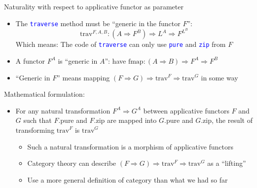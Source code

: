 \documentclass[english]{beamer}
\begin{document}
\begin{frame}{Naturality with respect to applicative functor as parameter}
\begin{itemize}
\item \vspace{-0.15cm}The{\footnotesize{} }\texttt{\textcolor{blue}{\footnotesize{}traverse}}
method must be ``generic in the functor $F$'':{\footnotesize{}
\[
\text{trav}^{F,A,B}:(A\Rightarrow F^{B})\Rightarrow L^{A}\Rightarrow F^{L^{B}}
\]
}Which means: The code of \texttt{\textcolor{blue}{\footnotesize{}traverse}}
can only use \texttt{\textcolor{blue}{\footnotesize{}pure}} and \texttt{\textcolor{blue}{\footnotesize{}zip}}
from $F$
\item A functor {\footnotesize{}$F^{A}$ }is ``generic in $A$'': have
{\footnotesize{}$\text{fmap}:\left(A\Rightarrow B\right)\Rightarrow F^{A}\Rightarrow F^{B}$}{\footnotesize\par}
\item ``Generic in $F$'' means mapping {\footnotesize{}$\left(F\Rightarrow G\right)\Rightarrow\text{trav}^{F}\Rightarrow\text{trav}^{G}$}
in some way
\end{itemize}
Mathematical formulation:
\begin{itemize}
\item For any natural transformation $F^{A}\Rightarrow G^{A}$ between applicative
functors $F$ and $G$ such that $F.\text{pure}$ and $F.\text{zip}$
are mapped into $G.\text{pure}$ and $G.\text{zip}$, the result of
transforming $\text{trav}^{F}$ is $\text{trav}^{G}$
\begin{itemize}
\item Such a natural transformation is a morphism of applicative functors
\item Category theory can describe {\footnotesize{}$\left(F\Rightarrow G\right)\Rightarrow\text{trav}^{F}\Rightarrow\text{trav}^{G}$}
as a ``lifting''
\item Use a more general definition of category than what we had so far
\end{itemize}
\end{itemize}
\end{frame}
\end{document}
